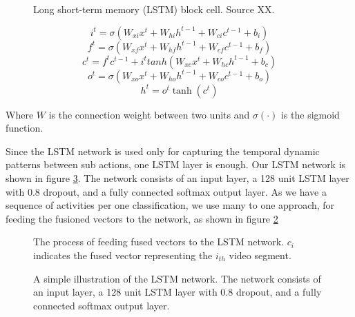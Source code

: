 \begin{figure}
  \centering
  
  \caption{Long short-term memory (LSTM) block cell. Source XX.}\label{fi:lstmblock}
\end{figure}

\begin{equation}
i^{t} = \sigma (W_{xi}x^t + W_{hi}h^{t-1} + W_{ci}c^{t-1} + b_{i})
\end{equation}
\begin{equation}
f^{t} = \sigma (W_{xf}x^t + W_{hf}h^{t-1} + W_{cf}c^{t-1} + b_{f})
\end{equation}
\begin{equation}
c^{t} = f^tc^{t-1} + i^ttanh(W_{xc}x^t + W_{hc}h^{t-1} + b_{c})
\end{equation}
\begin{equation}
o^{t} = \sigma (W_{xo}x^t + W_{ho}h^{t-1} + W_{co}c^{t-1} + b_{o})
\end{equation}
\begin{equation}
h^t = o^t\tanh(c^t)
\end{equation}

Where $W$ is the connection weight between two units and $\sigma(\cdot)$ is the sigmoid function.

Since the LSTM network is used only for capturing the temporal dynamic patterns between sub actions, one LSTM layer is enough.
Our LSTM network is shown in figure \ref{fi:layers}. The network consists of an input layer, a 128 unit LSTM layer with 0.8 dropout, and
a fully connected softmax output layer. As we have a sequence of activities per one classification, we use many to one approach,
for feeding the fusioned vectors to the network, as shown in figure \ref{fi:lstm}

\begin{figure}
  \centering
  
  \caption{The process of feeding fused vectors to the LSTM network. $c_{i}$ indicates the fused vector representing the $i_{th}$
  video segment.}\label{fi:lstm}
\end{figure}

\begin{figure}
  \centering
  
  \caption{A simple illustration of the LSTM network. The network consists of an input layer, a 128 unit LSTM layer with 0.8 dropout, and
a fully connected softmax output layer.}\label{fi:layers}
\end{figure}

